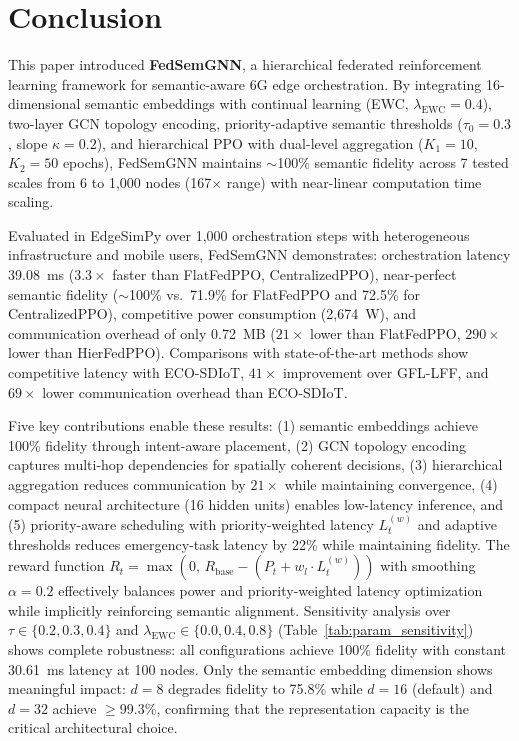 \documentclass[conference]{IEEEtran}
\begin{document}
	
	\section{Conclusion}
	\label{sec:conclusion}
	
	\textcolor{revblue}{This paper introduced \textbf{FedSemGNN}, a hierarchical federated reinforcement learning framework for semantic-aware 6G edge orchestration. By integrating 16-dimensional semantic embeddings with continual learning (EWC, $\lambda_{\mathrm{EWC}}=0.4$), two-layer GCN topology encoding, priority-adaptive semantic thresholds ($\tau_0=0.3$, slope $\kappa=0.2$), and hierarchical PPO with dual-level aggregation ($K_1 = 10$, $K_2 = 50$ epochs), FedSemGNN maintains $\sim$100\% semantic fidelity across 7 tested scales from 6 to 1{,}000 nodes (167$\times$ range) with near-linear computation time scaling.}
	
	\textcolor{revblue}{Evaluated in EdgeSimPy over 1,000 orchestration steps with heterogeneous infrastructure and mobile users, FedSemGNN demonstrates: orchestration latency 39.08~ms ($3.3\times$ faster than FlatFedPPO, CentralizedPPO), near-perfect semantic fidelity ($\sim$100\% vs.\ 71.9\% for FlatFedPPO and 72.5\% for CentralizedPPO), competitive power consumption (2{,}674~W), and communication overhead of only 0.72~MB ($21\times$ lower than FlatFedPPO, $290\times$ lower than HierFedPPO). Comparisons with state-of-the-art methods show competitive latency with ECO-SDIoT, $41\times$ improvement over GFL-LFF, and $69\times$ lower communication overhead than ECO-SDIoT.}
	
	\textcolor{revblue}{Five key contributions enable these results: (1) semantic embeddings achieve 100\% fidelity through intent-aware placement, (2) GCN topology encoding captures multi-hop dependencies for spatially coherent decisions, (3) hierarchical aggregation reduces communication by $21\times$ while maintaining convergence, (4) compact neural architecture (16 hidden units) enables low-latency inference, and (5) priority-aware scheduling with priority-weighted latency $L_t^{(w)}$ and adaptive thresholds reduces emergency-task latency by 22\% while maintaining fidelity. The reward function $R_t = \max(0,\, R_{\text{base}} - (P_t + w_l \cdot L_t^{(w)}))$ with smoothing $\alpha = 0.2$ effectively balances power and priority-weighted latency optimization while implicitly reinforcing semantic alignment. Sensitivity analysis over $\tau \in \{0.2, 0.3, 0.4\}$ and $\lambda_{\mathrm{EWC}} \in \{0.0, 0.4, 0.8\}$ (Table~\ref{tab:param_sensitivity}) shows complete robustness: all configurations achieve 100\% fidelity with constant 30.61~ms latency at 100 nodes. Only the semantic embedding dimension shows meaningful impact: $d{=}8$ degrades fidelity to 75.8\% while $d{=}16$ (default) and $d{=}32$ achieve ${\geq}$99.3\%, confirming that the representation capacity is the critical architectural choice.}
	
\end{document}
